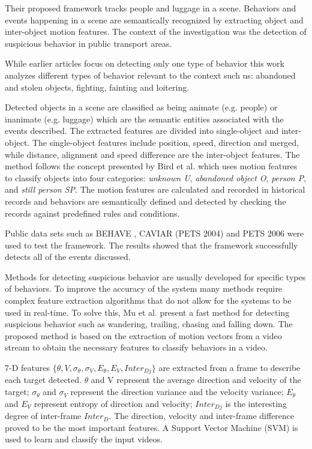 Their proposed framework tracks people and luggage in a scene. Behaviors and events happening in a scene are semantically recognized by extracting object and inter-object motion features. The context of the investigation was the detection of suspicious behavior in public transport areas.

While earlier articles focus on detecting only one type of behavior \cite{n5,n6} this work analyzes different types of behavior relevant to the context such us: abandoned and stolen objects, fighting, fainting and loitering.

Detected objects in a scene are classified as being animate (e.g. people) or inanimate (e.g. luggage) which are the semantic entities associated with the events described. The extracted features are divided into single-object and inter-object. The single-object features include position, speed, direction and merged, while distance, alignment and speed difference are the inter-object features. The method follows the concept presented by Bird et al. \cite{n6} which uses motion features to classify objects into four categories: \textit{unknown U}, \textit{abandoned object O}, \textit{person P}, and \textit{still person SP}. The motion features are calculated and recorded in historical records and behaviors are semantically defined and detected by checking the records against predefined rules and conditions.

Public data sets such as BEHAVE \cite{n20}, CAVIAR (PETS 2004) \cite{n21} and PETS 2006 \cite{n22} were used to test the framework. The results showed that the framework successfully detects all of the events discussed.

Methods for detecting suspicious behavior are usually developed for specific types of behaviors. To improve the accuracy of the system many methods require complex feature extraction algorithms that do not allow for the systems to be used in real-time. To solve this, Mu et al. \cite{n7} present a fast method for detecting suspicious behavior such as wandering, trailing, chasing and falling down. The proposed method is based on the extraction of motion vectors from a video stream to obtain the necessary features to classify behaviors in a video.

7-D features \(\{\theta, V, \sigma_{\theta}, \sigma_{V}, E_{\theta}, E_{V}, Inter_{Dj}\} \) are extracted from a frame to describe each target detected. \(\theta\) and V represent the average direction and velocity of the target; \(\sigma_{\theta}\) and \(\sigma_{V}\) represent the direction variance and the velocity variance; \(E_{\theta}\) and \(E_{V}\) represent entropy of direction and velocity; \(Inter_{Dj}\) is the interesting degree of inter-frame \(Inter_{D}\). The direction, velocity and inter-frame difference proved to be the most important features. A Support Vector Machine (SVM) is used to learn and classify the input videos.

